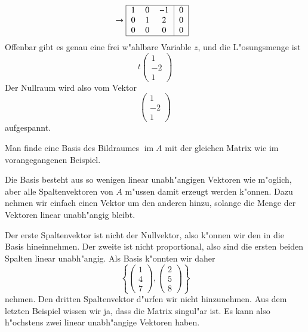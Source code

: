 \begin{beispiel}
\begin{align*}
&\rightarrow
\begin{tabular}{|>{$}c<{$}>{$}c<{$}>{$}c<{$}|>{$}c<{$}|}
\hline
 1& 0& -1&0\\
 0& 1&  2&0\\
 0& 0&  0&0\\
\hline
\end{tabular}
\end{align*}
Offenbar gibt es genau eine frei w"ahlbare Variable $z$, und
die L"osungsmenge ist 
\[
t\begin{pmatrix}
1\\-2\\1
\end{pmatrix}
\]
Der Nullraum wird also vom Vektor
\[
\begin{pmatrix}
1\\-2\\1
\end{pmatrix}
\]
aufgespannt.
\end{beispiel}

\begin{beispiel}
Man finde eine Basis des Bildraumes $\operatorname{im}A$ mit der gleichen
Matrix wie im vorangegangenen Beispiel.

Die Basis besteht aus so wenigen linear unabh"angigen Vektoren wie
m"oglich, aber alle Spaltenvektoren von $A$ m"ussen damit erzeugt
werden k"onnen.
Dazu nehmen wir einfach einen Vektor um den anderen
hinzu, solange die Menge der Vektoren linear unabh"angig bleibt.

Der erste Spaltenvektor ist nicht der Nullvektor, also k"onnen wir
den in die Basis hineinnehmen.
Der zweite ist nicht proportional,
also sind die ersten beiden Spalten linear unabh"angig.
Als
Basis k"onnten wir daher
\[
\left\{
\begin{pmatrix}1\\4\\7\end{pmatrix}
,
\begin{pmatrix}2\\5\\8\end{pmatrix}
\right\}
\]
nehmen.
Den dritten Spaltenvektor d"urfen wir nicht hinzunehmen.
Aus dem letzten Beispiel wissen wir ja, dass die Matrix singul"ar
ist.
Es kann also h"ochstens zwei linear unabh"angige Vektoren haben.
\end{beispiel}

